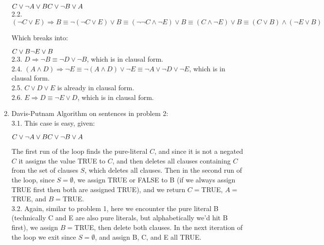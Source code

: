 \documentclass{article}
\begin{document}
\begin{enumerate}
		$C \vee \neg A \vee B\\
		 C \vee  \neg B \vee A$\\
		
		2.2. $(\neg C \vee E) \Rightarrow B \equiv \neg(\neg C \vee E) \vee B \equiv (\neg\neg C \wedge \neg E) \vee B \equiv (C \wedge \neg E) \vee B \equiv (C \vee B) \wedge (\neg E \vee B)$
		
		Which breaks into:
		
		$C \vee B\\
		\neg E \vee B$\\
		
		2.3. $D \Rightarrow \neg B \equiv \neg D \vee \neg B$, which is in clausal form.\\
		
		2.4. $(A \wedge D) \Rightarrow \neg E \equiv \neg(A \wedge D) \vee \neg E \equiv \neg A \vee \neg D \vee \neg E$, which is in clausal form.\\

		2.5. $C \vee D \vee E$ is already in clausal form.\\
		
		2.6. $E \Rightarrow D \equiv \neg E \vee D$, which is in clausal form.\\
		
		\item Davis-Putnam Algorithm on sentences in problem 2:\\
		
		3.1. This case is easy, given:
		
		$C \vee \neg A \vee B\\
		C \vee  \neg B \vee A$
		
		The first run of the loop finds the pure-literal $C$, and since it is not a negated $C$ it assigns the value TRUE to $C$, and then deletes all clauses containing $C$ from the set of clauses $S$, which deletes all clauses.  Then in the second run of the loop, since $S = \emptyset$, we assign TRUE or FALSE to B (if we always assign TRUE first then both are assigned TRUE), and we return $C=$TRUE, $A=$TRUE, and $B=$TRUE.\\
		
		3.2. Again, similar to problem 1, here we encounter the pure literal B (technically C and E are also pure literals, but alphabetically we'd hit B first), we assign $B=$TRUE, then delete both clauses.  In the next iteration of the loop we exit since $S = \emptyset$, and assign B, C, and E all TRUE.\\
		

\end{enumerate}
\end{document}
